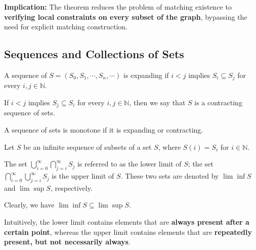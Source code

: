 \documentclass[../main.tex]{subfiles}
\begin{document}
\begin{green}
    
\textbf{Implication:} The theorem reduces the problem of matching existence to \textbf{verifying local constraints on every subset of the graph}, bypassing the need for explicit matching construction.

\end{green}



\subsection{Sequences and Collections of Sets}

\begin{purple}
\begin{definition}

A sequence of $S=(S_0,S_1,\cdots,S_n,\cdots)$ is expanding if $i<j$ implies $S_i\subseteq S_j$ for every $i,j\in \mathbb{N}$.


If $i<j$ implies $S_j \subseteq S_i$ for every $i,j\in \mathbb{N}$, then we say that $S$ is a contracting sequence of sets.

A sequence of sets is monotone if it is expanding or contracting.
\end{definition}
\end{purple}

\begin{purple}
\begin{definition}
Let $S$ be an infinite sequence of subsets of a set $S$, where $S(i)=S_i$ for $i\in \mathbb{N}$.

The set $\bigcup_{i=0}^\infty\bigcap_{j=i}^{\infty}S_j$ is referred to as the lower limit of $S$; the set $\bigcap_{i=0}^{\infty}\bigcup_{j=i}^{\infty} S_j$ is the upper limit of $S$. These two sets are denoted by $\lim\inf S$ and $\lim\sup S$, respectively.

Clearly, we have $\lim\inf S\subseteq \lim\sup S$.
\end{definition}
\end{purple}

\begin{green}
    
Intuitively, the lower limit contains elements that are \textbf{always present after a certain point}, whereas the upper limit contains elements that are \textbf{repeatedly present, but not necessarily always}.

\end{green}
\end{document}
